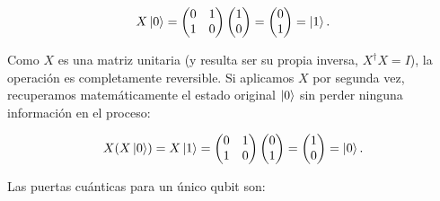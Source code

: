 \[
    X \ket{0} = \begin{pmatrix} 0 & 1 \\ 1 & 0 \end{pmatrix} \begin{pmatrix} 1 \\ 0 \end{pmatrix} = \begin{pmatrix} 0 \\ 1 \end{pmatrix} = \ket{1}.
\]

Como $X$ es una matriz unitaria (y resulta ser su propia inversa, $X^{\dagger}X = I$), la operación es completamente reversible. Si aplicamos $X$ por segunda vez, recuperamos matemáticamente el estado original $\ket{0}$ sin perder ninguna información en el proceso:

\[
    X (X \ket{0}) = X \ket{1} = \begin{pmatrix} 0 & 1 \\ 1 & 0 \end{pmatrix} \begin{pmatrix} 0 \\ 1 \end{pmatrix} = \begin{pmatrix} 1 \\ 0 \end{pmatrix} = \ket{0}.
\]

Las puertas cuánticas para un único qubit son:


